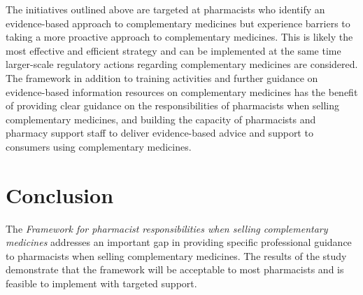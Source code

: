 \documentclass[12pt,]{article}
\begin{document}
The initiatives outlined above are targeted at pharmacists who identify
an evidence-based approach to complementary medicines but experience
barriers to taking a more proactive approach to complementary medicines.
This is likely the most effective and efficient strategy and can be
implemented at the same time larger-scale regulatory actions regarding
complementary medicines are considered. The framework in addition to
training activities and further guidance on evidence-based information
resources on complementary medicines has the benefit of providing clear
guidance on the responsibilities of pharmacists when selling
complementary medicines, and building the capacity of pharmacists and
pharmacy support staff to deliver evidence-based advice and support to
consumers using complementary medicines.

\section{Conclusion}\label{conclusion}

The \emph{Framework for pharmacist responsibilities when selling
complementary medicines} addresses an important gap in providing
specific professional guidance to pharmacists when selling complementary
medicines. The results of the study demonstrate that the framework will
be acceptable to most pharmacists and is feasible to implement with
targeted support.

\printbibliography[title=References]
\end{document}
